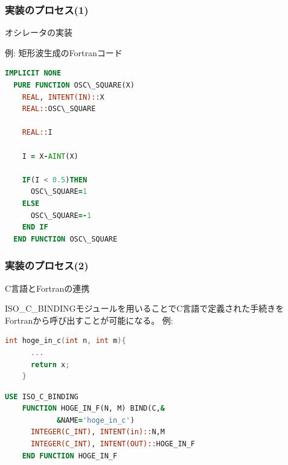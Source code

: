 \documentclass[dvipdfmx]{beamer} %
\begin{document}
\begin{frame}[fragile]
  \frametitle{実装のプロセス(1)}
  \alert{オシレータの実装}
  
  例: 矩形波生成のFortranコード
  \begin{lstlisting}[language={Fortran}]
  IMPLICIT NONE
  PURE FUNCTION OSC\_SQUARE(X)
    REAL, INTENT(IN)::X
    REAL::OSC\_SQUARE

    REAL::I

    I = X-AINT(X)

    IF(I < 0.5)THEN
      OSC\_SQUARE=1
    ELSE
      OSC\_SQUARE=-1
    END IF
  END FUNCTION OSC\_SQUARE 
  \end{lstlisting}
  
  \vspace{0.5em}
\end{frame}

\begin{frame}[fragile]
  \frametitle{実装のプロセス(2)}
  \alert{C言語とFortranの連携}\par
  ISO\_C\_BINDINGモジュールを用いることでC言語で定義された手続きをFortranから呼び出すことが可能になる。
  例:\par
  \begin{lstlisting}[language={C}]
    int hoge_in_c(int n, int m){
      ...
      return x;
    }
  \end{lstlisting}
  \begin{lstlisting}[language={Fortran}]
    USE ISO_C_BINDING
    FUNCTION HOGE_IN_F(N, M) BIND(C,&
            &NAME='hoge_in_c')
      INTEGER(C_INT), INTENT(in)::N,M
      INTEGER(C_INT), INTENT(OUT)::HOGE_IN_F
    END FUNCTION HOGE_IN_F
  \end{lstlisting}  
\end{frame}
\end{document}
